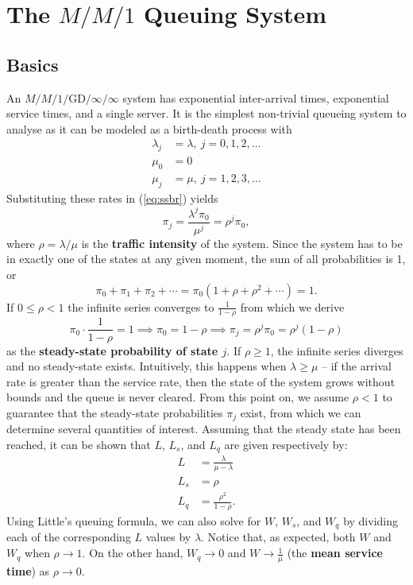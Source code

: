 \section{The $M/M/1$ Queuing System}
\subsection{Basics} An $M/M/1/\textrm{GD}/\infty/\infty$ system has exponential inter-arrival times, exponential service times, and a single server. It is the simplest non-trivial queueing system to analyse as it can be modeled as a birth-death process with
\begin{align*}
\lambda_{j} &= \lambda, \ j=0,1,2,\ldots \\ 
\mu_{0} &= 0 \\
\mu_{j} &= \mu,\  j=1,2,3,\ldots 
\end{align*}
Substituting these rates in (\ref{eq:ssbr}) yields 
$$\pi_{j} = \frac{\lambda^{j} \pi_{0}}{\mu^{j}}=\rho^j \pi_0,$$ where $\rho = \lambda/\mu$ is the \textbf{traffic intensity} of the system. Since the system has to be in exactly one of the states at any given moment, the sum of all probabilities is 1, or $$ \pi_{0}+\pi_1 + \pi_2+\cdots = \pi_0(1+\rho+\rho^{2}+\cdots ) = 1.$$
If $0 \leq \rho < 1$ the infinite series converges to $\frac{1}{1-\rho}$ from which we derive $$\pi_{0}\cdot \frac{1}{1-\rho} = 1 \implies \pi_0 = 1-\rho \implies \pi_{j} = \rho^{j} \pi_0 = \rho^j (1-\rho)$$
as the \textbf{steady-state probability of state $j$}.  If $\rho \geq 1$, the infinite series diverges and no steady-state exists. Intuitively, this happens when $\lambda \geq \mu$ -- if the arrival rate is greater than the service rate, then the state of the system grows without bounds and the queue is never cleared.
\newl From this point on, we assume $\rho < 1$ to guarantee that the steady-state probabilities $\pi_{j}$  exist, from which we can determine several quantities of interest. Assuming
that the steady state has been reached, it can be shown that $L$, $L_{s}$, and $L_{q}$ are given respectively by:
\begin{align*}
L &= \frac{\lambda}{\mu - \lambda}\\
L_{s} &= \rho\\
 L_{q} &= \frac{\rho^{2}}{1-\rho}.
 \end{align*}
Using Little's queuing formula, we can also solve for $W$, $W_{s}$, and $W_{q}$ by dividing each of the corresponding $L$ values by $\lambda$.  Notice that, as expected, both $W$ and $W_{q}$ when $\rho\to 1$. On the other hand, $W_{q}\to 0$ and $W\to \frac{1}{\mu}$ (the \textbf{mean service time}) as $\rho\to 0$.
